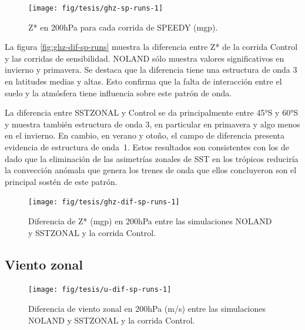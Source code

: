 \documentclass[spanish,a4paper,12pt,oneside]{book}
\begin{document}
\begin{landscape}\begin{figure}

{\centering \texttt{[image: fig/tesis/ghz-sp-runs-1]} 

}

\caption{Z* en 200hPa para cada corrida de SPEEDY (mgp).}\label{fig:ghz-sp-runs}
\end{figure}
\end{landscape}

La figura \autoref{fig:ghz-dif-sp-runs} muestra la diferencia entre Z*
de la corrida Control y las corridas de sensibilidad. NOLAND sólo
muestra valores significativos en invierno y primavera. Se destaca que
la diferencia tiene una estructura de onda 3 en latitudes medias y
altas. Esto confirma que la falta de interacción entre el suelo y la
atmósfera tiene influencia sobre este patrón de onda.

La diferencia entre SSTZONAL y Control se da principalmente entre 45°S y
60°S y muestra también estructura de onda 3, en particular en primavera
y algo menos en el invierno. En cambio, en verano y otoño, el campo de
diferencia presenta evidencia de estructura de onda~1. Estos resultados
son consistentes con los de \citet{Quintanar1995} dado que la
eliminación de las asimetrías zonales de SST en los trópicos reduciría
la convección anómala que genera los trenes de onda que ellos
concluyeron son el principal sostén de este patrón.

\begin{landscape}\begin{figure}

{\centering \texttt{[image: fig/tesis/ghz-dif-sp-runs-1]} 

}

\caption{Diferencia de Z* (mgp) en 200hPa entre las simulaciones NOLAND y SSTZONAL y la corrida Control.}\label{fig:ghz-dif-sp-runs}
\end{figure}
\end{landscape}

\subsection{Viento zonal}\label{viento-zonal-2}

\begin{landscape}\begin{figure}

{\centering \texttt{[image: fig/tesis/u-dif-sp-runs-1]} 

}

\caption{Diferencia de viento zonal en 200hPa (m/s) entre las simulaciones NOLAND y SSTZONAL y la corrida Control.}\label{fig:u-dif-sp-runs}
\end{figure}
\end{landscape}
\end{document}
